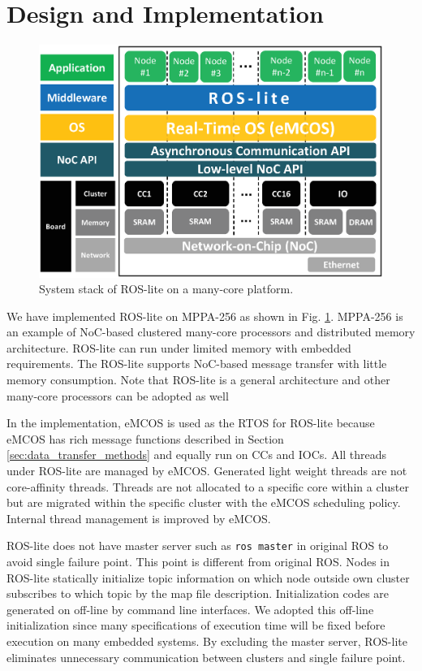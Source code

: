 \section{Design and Implementation}
\label{sec:design_and_implementation}

\begin{figure}[H]
  \centering
  \includegraphics[width=0.7\linewidth]{../figure/roslite/software_stack.eps}
  \caption{\label{fig:rosl_software_stack}
    System stack of ROS-lite on a many-core platform.}
\end{figure}

We have implemented ROS-lite on MPPA-256 as shown in Fig. \ref{fig:rosl_software_stack}.
MPPA-256 is an example of NoC-based clustered many-core processors and distributed memory architecture.
ROS-lite can run under limited memory with embedded requirements.
The ROS-lite supports NoC-based message transfer with little memory consumption.
Note that ROS-lite is a general architecture and other many-core processors can be adopted as well

In the implementation, eMCOS is used as the RTOS for ROS-lite because eMCOS has rich message functions described in Section \ref{sec:data_transfer_methods} and equally run on CCs and IOCs.
All threads under ROS-lite are managed by eMCOS.
Generated light weight threads are not core-affinity threads.
Threads are not allocated to a specific core within a cluster but are migrated within the specific cluster with the eMCOS scheduling policy.
Internal thread management is improved by eMCOS.

ROS-lite does not have master server such as \texttt{ros master} in original ROS to avoid single failure point.
This point is different from original ROS.
Nodes in ROS-lite statically initialize topic information on which node outside own cluster subscribes to which topic by the map file description.
Initialization codes are generated on off-line by command line interfaces.
We adopted this off-line initialization since many specifications of execution time will be fixed before execution on many embedded systems.
By excluding the master server, ROS-lite eliminates unnecessary communication between clusters and single failure point.

